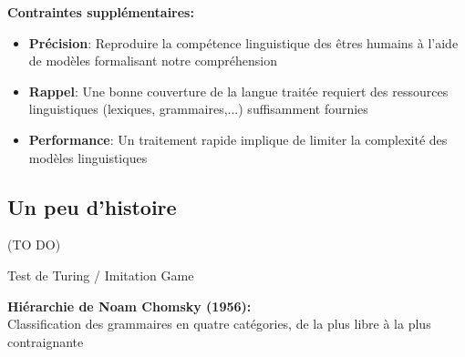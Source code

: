 \noindent\textbf{Contraintes supplémentaires:}

\begin{itemize}
    \item \textbf{Précision}: Reproduire la compétence linguistique des êtres humains à l'aide de modèles
    formalisant notre compréhension
    \item \textbf{Rappel}: Une bonne couverture de la langue traitée requiert des ressources
    linguistiques (lexiques, grammaires,...) suffisamment fournies
    \item \textbf{Performance}: Un traitement rapide implique de limiter la complexité des modèles linguistiques
\end{itemize}

\subsection{Un peu d'histoire}

(TO DO)

Test de Turing / Imitation Game

\newpage

\textbf{Hiérarchie de Noam Chomsky (1956):} \\

Classification des grammaires en quatre catégories, de la plus libre à la plus contraignante

\vspace{1cm}

\resizebox{0.9\textwidth}{!}{
    
}
